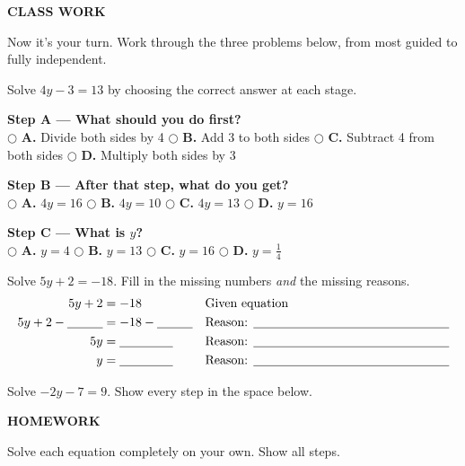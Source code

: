 \documentclass[11pt]{article}
\newcommand{\choice}[2]{\hspace{2mm}$\bigcirc$\; \textbf{#1.} #2}
\newcommand{\banner}[2]{%
  \begin{center}
  \colorbox{#1}{\parbox{0.97\linewidth}{\centering\color{white}\bfseries\Large\vspace{1.2mm} #2 \vspace{1.2mm}}}
  \end{center}%
  \vspace{2mm}
}
\begin{document}
\banner{brandred}{CLASS WORK}
Now it's your turn. Work through the three problems below, from most guided to fully independent.

\begin{mcbox}
Solve $4y - 3 = 13$ by choosing the correct answer at each stage.

\textbf{Step A --- What should you do first?}\\
\choice{A}{Divide both sides by 4}\quad
\choice{B}{Add 3 to both sides}\quad
\choice{C}{Subtract 4 from both sides}\quad
\choice{D}{Multiply both sides by 3}

\vspace{2mm}
\textbf{Step B --- After that step, what do you get?}\\
\choice{A}{$4y = 16$}\quad
\choice{B}{$4y = 10$}\quad
\choice{C}{$4y = 13$}\quad
\choice{D}{$y = 16$}

\vspace{2mm}
\textbf{Step C --- What is $y$?}\\
\choice{A}{$y = 4$}\quad
\choice{B}{$y = 13$}\quad
\choice{C}{$y = 16$}\quad
\choice{D}{$y = \tfrac{1}{4}$}
\end{mcbox}

\begin{fillbox}
Solve $5y + 2 = -18$. Fill in the missing numbers \emph{and} the missing reasons.
\begin{align*}
5y + 2 &= -18 &&\text{Given equation}\\
5y + 2 - \underline{\hspace{1cm}} &= -18 - \underline{\hspace{1cm}} &&\text{Reason: }\underline{\hspace{5.5cm}}\\
5y &= \underline{\hspace{1.5cm}} &&\text{Reason: }\underline{\hspace{5.5cm}}\\
y &= \underline{\hspace{1.5cm}} &&\text{Reason: }\underline{\hspace{5.5cm}}
\end{align*}
\end{fillbox}

\begin{indepbox}
Solve $-2y - 7 = 9$. Show every step in the space below.

\vspace{22mm}
\end{indepbox}

\vspace{2mm}
\banner{black!75}{HOMEWORK}
Solve each equation completely on your own. Show all steps.
\end{document}
